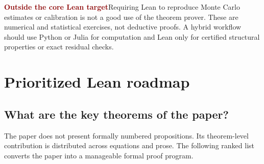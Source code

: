 \documentclass[11pt]{article}
\newcommand{\outside}{\textcolor{darkred}{\textbf{Outside the core Lean target}}}
\newcommand{\statusbox}[2]{\colorbox{#1}{\parbox{0.94\linewidth}{#2}}}
\begin{document}
\statusbox{softred}{\outside\quad Requiring Lean to reproduce Monte Carlo estimates or calibration is not a good use of the theorem prover. These are numerical and statistical exercises, not deductive proofs. A hybrid workflow should use Python or Julia for computation and Lean only for certified structural properties or exact residual checks.}

\section{Prioritized Lean roadmap}

\subsection{What are the key theorems of the paper?}
The paper does not present formally numbered propositions. Its theorem-level contribution is distributed across equations and prose. The following ranked list converts the paper into a manageable formal proof program.
\end{document}
